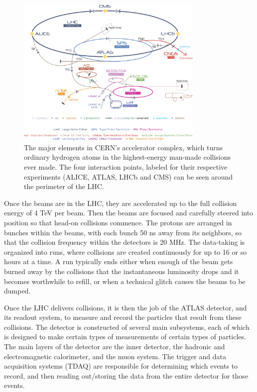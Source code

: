 \begin{figure}
	\centering
	\includegraphics[width=0.8\textwidth]{ATLASDetector/images/Cern-Accelerator-Complex.pdf}
	\caption{ The major elements in CERN's accelerator complex, which turns ordinary hydrogen atoms in the highest-energy man-made collisions ever made. The four interaction points, labeled for their respective experiments (ALICE, ATLAS, LHCb and CMS) can be seen around the perimeter of the LHC. \label{fig:accelerator_complex}}
\end{figure}



Once the beams are in the LHC, they are accelerated up to the full collision energy of 4 TeV per beam.  Then the beams are focused  and carefully steered into position so that head-on collisions commence.  The protons are arranged in bunches within the beams, with each bunch 50 ns away from its neighbors, so that the collision frequency within the detectors is 20 MHz.  The data-taking is organized into runs, where collisions are created continuously for up to 16 or so hours at a time.  A run typically ends either when enough of the beam gets burned away by the collisions that the instantaneous luminosity drops and it becomes worthwhile to refill, or when a technical glitch causes the beams to be dumped.



Once the LHC delivers collisions, it is then the job of the ATLAS detector, and its readout system, to measure and record the particles that result from these collisions.  The detector is constructed of several main subsystems, each of which is designed to make certain types of measurements of certain types of particles.  The main layers of the detector are the inner detector, the hadronic and electromagnetic calorimeter, and the muon system.  The trigger and data acquisition systems (TDAQ) are responsible for determining which events to record, and then reading out/storing the data from the entire detector for those events.


